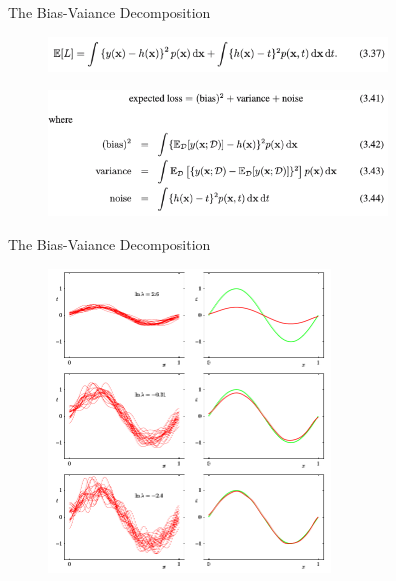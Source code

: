 \documentclass[9pt]{beamer}
\begin{document}
\begin{frame}{The Bias-Vaiance Decomposition}
    \begin{figure}[H]
        \includegraphics[width=9cm]{../images/Bishop_MachineLearning_Eq3-37.png}
        \label{eq:3.47}
    \end{figure}
    \begin{figure}
        \includegraphics[width=9cm]{../images/Bishop_MachineLearning_Eq3-41-44.png}
        \label{eq:3.41}
    \end{figure}
\end{frame}

\begin{frame}{The Bias-Vaiance Decomposition}
    \begin{figure}[H]
        \includegraphics[width=7.5cm]{../images/Bishop_MachineLearning_Figure3-5.png}
        \label{fig:3.5}
    \end{figure}
\end{frame}
\end{document}
